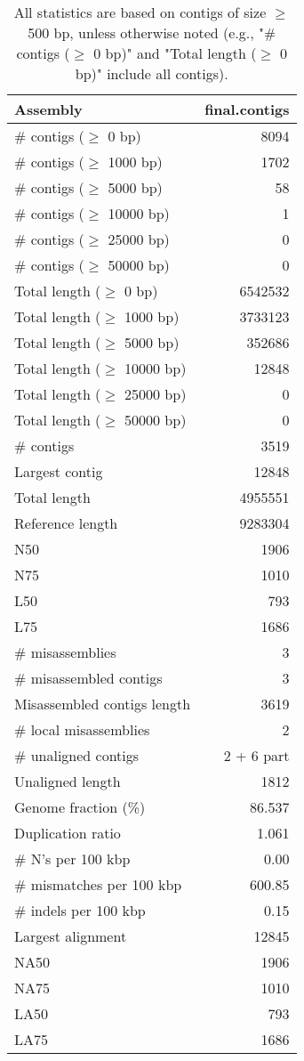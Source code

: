 \documentclass[12pt,a4paper]{article}
\begin{document}
\begin{table}[ht]
\begin{center}
\caption{All statistics are based on contigs of size $\geq$ 500 bp, unless otherwise noted (e.g., "\# contigs ($\geq$ 0 bp)" and "Total length ($\geq$ 0 bp)" include all contigs).}
\begin{tabular}{|l*{1}{|r}|}
\hline
Assembly & final.contigs \\ \hline
\# contigs ($\geq$ 0 bp) & 8094 \\ \hline
\# contigs ($\geq$ 1000 bp) & 1702 \\ \hline
\# contigs ($\geq$ 5000 bp) & 58 \\ \hline
\# contigs ($\geq$ 10000 bp) & 1 \\ \hline
\# contigs ($\geq$ 25000 bp) & 0 \\ \hline
\# contigs ($\geq$ 50000 bp) & 0 \\ \hline
Total length ($\geq$ 0 bp) & 6542532 \\ \hline
Total length ($\geq$ 1000 bp) & 3733123 \\ \hline
Total length ($\geq$ 5000 bp) & 352686 \\ \hline
Total length ($\geq$ 10000 bp) & 12848 \\ \hline
Total length ($\geq$ 25000 bp) & 0 \\ \hline
Total length ($\geq$ 50000 bp) & 0 \\ \hline
\# contigs & 3519 \\ \hline
Largest contig & 12848 \\ \hline
Total length & 4955551 \\ \hline
Reference length & 9283304 \\ \hline
N50 & 1906 \\ \hline
N75 & 1010 \\ \hline
L50 & 793 \\ \hline
L75 & 1686 \\ \hline
\# misassemblies & 3 \\ \hline
\# misassembled contigs & 3 \\ \hline
Misassembled contigs length & 3619 \\ \hline
\# local misassemblies & 2 \\ \hline
\# unaligned contigs & 2 + 6 part \\ \hline
Unaligned length & 1812 \\ \hline
Genome fraction (\%) & 86.537 \\ \hline
Duplication ratio & 1.061 \\ \hline
\# N's per 100 kbp & 0.00 \\ \hline
\# mismatches per 100 kbp & 600.85 \\ \hline
\# indels per 100 kbp & 0.15 \\ \hline
Largest alignment & 12845 \\ \hline
NA50 & 1906 \\ \hline
NA75 & 1010 \\ \hline
LA50 & 793 \\ \hline
LA75 & 1686 \\ \hline
\end{tabular}
\end{center}
\end{table}
\end{document}
